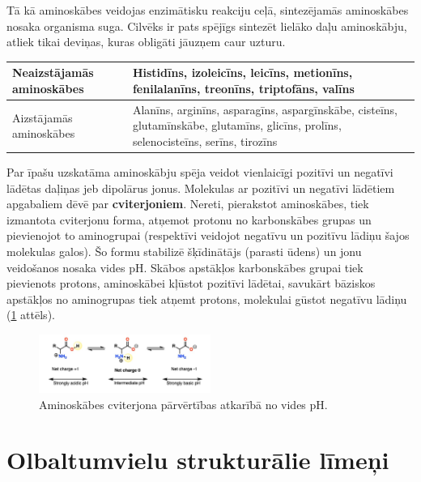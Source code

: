 \documentclass[12pt,a4paper]{article}
\newcommand{\figref}[1]{\ref{#1} attēls}
\begin{document}
Tā kā aminoskābes veidojas enzimātisku reakciju ceļā, sintezējamās aminoskābes nosaka organisma suga. Cilvēks ir pats spējīgs sintezēt lielāko daļu aminoskābju, atliek tikai deviņas, kuras obligāti jāuzņem caur uzturu. 

\begin{table}[H]
\centering
\begin{tabularx}{\textwidth}{|
    >{\raggedright\arraybackslash}p{4.5cm}|
    >{\raggedright\arraybackslash}X|}
\hline
Neaizstājamās aminoskābes &
Histidīns, izoleicīns, leicīns, metionīns, fenilalanīns, treonīns, triptofāns, valīns \\
\hline
Aizstājamās aminoskābes &
Alanīns, arginīns, asparagīns, aspargīnskābe, cisteīns, glutamīnskābe,
glutamīns, glicīns, prolīns, selenocisteīns, serīns, tirozīns \\
\hline
\end{tabularx}
\end{table}


Par īpašu uzskatāma aminoskābju spēja veidot vienlaicīgi pozitīvi un negatīvi lādētas daļiņas jeb dipolārus jonus. Molekulas ar pozitīvi un negatīvi lādētiem apgabaliem dēvē par \textbf{cviterjoniem}. Nereti, pierakstot aminoskābes, tiek izmantota cviterjonu forma, atņemot protonu no karbonskābes grupas un pievienojot to aminogrupai (respektīvi veidojot negatīvu un pozitīvu lādiņu šajos molekulas galos). Šo formu stabilizē šķīdinātājs (parasti ūdens) un jonu veidošanos nosaka vides pH. Skābos apstākļos karbonskābes grupai tiek pievienots protons, aminoskābei kļūstot pozitīvi lādētai, savukārt bāziskos apstākļos no aminogrupas tiek atņemt protons, molekulai gūstot negatīvu lādiņu (\figref{fig:cviterjoni}).

\begin{figure}[H]
    \centering
    \includegraphics[width=0.5\textwidth]{atteli/proteīni 2.jpg}
    \caption{Aminoskābes cviterjona pārvērtības atkarībā no vides pH.}
    \label{fig:cviterjoni}
\end{figure}

\section{Olbaltumvielu strukturālie līmeņi}
\end{document}
